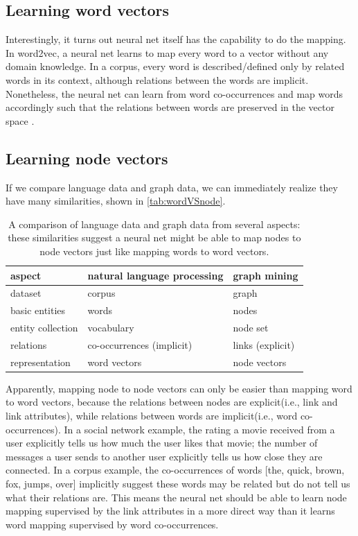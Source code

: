 \documentclass{article}
\begin{document}
\subsection{Learning word vectors}
Interestingly, it turns out neural net itself has the capability to do the mapping.
In word2vec, a neural net learns to map every word to a vector without any domain knowledge. In a corpus, every word is described/defined only by related words in its context, although relations between the words are implicit. Nonetheless, the neural net can learn from word co-occurrences and map words accordingly such that the relations between words are preserved in the vector space \cite{mikolov2013distributed}.

\subsection{Learning node vectors}
If we compare language data and graph data, we can immediately realize they have many similarities, shown in \autoref{tab:wordVSnode}.
\begin{table}[H]
	\centering
	\begin{tabularx}{\textwidth}{ |X|X|X| } \hline
		aspect  & natural language processing & graph mining \\ \hline
		dataset & corpus & graph \\ \hline
		basic entities & words & nodes \\ \hline
		entity collection & vocabulary & node set \\ \hline
		relations & co-occurrences (implicit) & links (explicit) \\ \hline
		representation & word vectors & node vectors \\ \hline
	\end{tabularx}
	\caption{A comparison of language data and graph data from 
		several aspects: these similarities suggest a neural net might be able to map nodes to node vectors just like mapping words to word vectors.}
	\label{tab:wordVSnode}
\end{table}
Apparently, mapping node to node vectors can only be easier than mapping word to word vectors, because the relations between nodes are explicit(i.e., link and link attributes), while relations between words are implicit(i.e., word co-occurrences). In a social network example, the rating a movie received from a user explicitly tells us how much the user likes that movie; the number of messages a user sends to another user explicitly tells us how close they are connected. In a corpus example, the co-occurrences of words [the, quick, brown, fox, jumps, over] implicitly suggest these words may be related but do not tell us what their relations are. This means the neural net should be able to learn node mapping supervised by the link attributes in a more direct way than it learns word mapping supervised by word co-occurrences.
\end{document}
